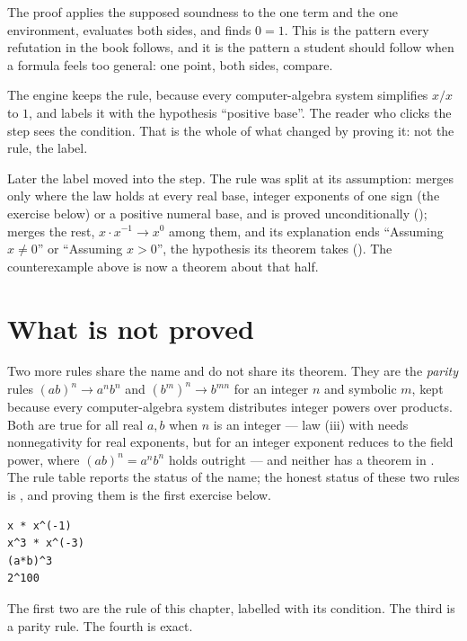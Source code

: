 The proof applies the supposed soundness to the one term and the one environment, evaluates both
sides, and finds $0 = 1$. This is the pattern every refutation in the book follows, and it is
the pattern a student should follow when a formula feels too general: one point, both sides,
compare.

The engine keeps the rule, because every computer-algebra system simplifies $x/x$ to $1$, and
labels it  with the hypothesis ``positive base''. The reader who clicks the
step sees the condition. That is the whole of what changed by proving it: not the rule, the
label.

Later the label moved into the step. The rule was split at its assumption: 
merges only where the law holds at every real base, integer exponents of one sign (the exercise
below) or a positive numeral base, and is proved unconditionally ();
 merges the rest, $x \cdot x^{-1} \to x^0$ among them, and its
explanation ends ``Assuming $x \neq 0$'' or ``Assuming $x > 0$'', the hypothesis its theorem takes
(). The counterexample above is now a theorem about that half.

\section{What is not proved}

Two more rules share the name  and do not share its theorem. They are the
\emph{parity} rules $(ab)^n \to a^n b^n$ and $(b^m)^n \to b^{mn}$ for an integer $n$ and
symbolic $m$, kept because every computer-algebra system distributes integer powers over
products. Both are true for all real $a, b$ when $n$ is an integer --- law (iii) with
 needs nonnegativity for real exponents, but for an integer exponent
 reduces to the field power, where $(ab)^n = a^n b^n$ holds outright ---
and neither has a theorem in . The rule table reports the status of the name;
the honest status of these two rules is , and proving them is the first
exercise below.

\begin{trybox}
\begin{verbatim}
x * x^(-1)
x^3 * x^(-3)
(a*b)^3
2^100
\end{verbatim}
  The first two are the rule of this chapter, labelled with its condition. The third is a
  parity rule. The fourth is exact.
\end{trybox}

